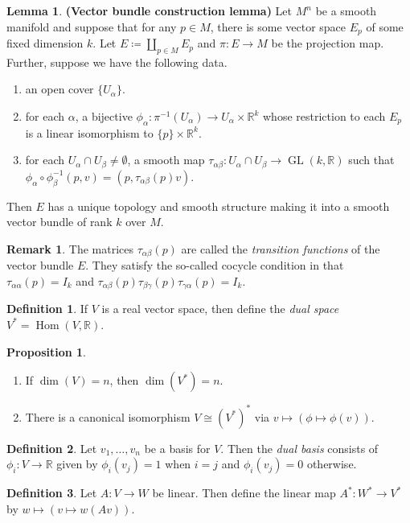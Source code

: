 \documentclass[10pt,letterpaper,cm]{nupset}
\theoremstyle{definition}
\newtheorem*{definition}{Definition}
\newtheorem{remark}{Remark}
\newtheorem{lemma}{Lemma}
\newtheorem{prop}{Proposition}
\newcommand{\R}{\mathbb R}
\newcommand{\1}{\mathbf{1}}
\newcommand{\0}{\vec 0}
\DeclareMathOperator{\GL}{GL}
\DeclareMathOperator{\Hom}{Hom}
\begin{document}
\begin{lemma}{\textbf{(Vector bundle construction lemma)}}
Let $M^n$ be a smooth manifold and suppose that for any $p\in M$, there is some vector space $E_p$ of some fixed dimension $k$. Let $E\coloneqq  \coprod_{p\in M} E_p$ and $\pi : E \to M$ be the projection map. Further, suppose we have the following data.
\begin{enumerate}
\item an open cover $\{U_{\alpha}\}$.
\item for each $\alpha$, a bijective $\phi_{\alpha} : \pi^{-1}(U_{\alpha}) \to U_{\alpha} \times \R^k$ whose restriction to each $E_p$ is a linear isomorphism to $\{p\}\times \R^k$.
\item for each $U_{\alpha} \cap U_{\beta} \ne \emptyset$, a smooth map $\tau_{\alpha \beta} : U_{\alpha} \cap U_{\beta} \to \GL(k , \R)$ such that $\phi_{\alpha} \circ \phi_{\beta}^{-1}(p, v) = (p, \tau_{\alpha \beta}(p)v)$.
\end{enumerate}
Then $E$ has a unique topology and smooth structure making it into a smooth vector bundle of rank $k$ over $M$.
\end{lemma}

\begin{remark}
The matrices $\tau_{\alpha \beta}(p)$ are called the \textit{transition functions} of the vector bundle $E$. They satisfy the so-called cocycle condition in that $\tau_{\alpha \alpha}(p) = I_k$ and $\tau_{\alpha \beta}(p)\tau_{\beta \gamma}(p)\tau_{\gamma \alpha}(p) = I_k$.
\end{remark}

\begin{definition}
If $V$ is a real vector space, then define the \textit{dual space} $V^{\ast} = \Hom(V, \R)$.
\end{definition}
\begin{prop} $ $ 
\begin{enumerate}
\item If $\dim(V) =n$, then $\dim(V^{\ast}) = n$.
\item There is a canonical isomorphism $V \cong (V^{\ast})^{\ast}$ via $v \mapsto (\phi \mapsto \phi(v))$.
\end{enumerate}
\end{prop}
\begin{definition}
Let $v_1, \ldots, v_n$ be a basis for $V$. Then the \textit{dual basis} consists of $\phi_i : V \to \R$ given by $\phi_i(v_j) = 1$ when $i = j$ and $\phi_i(v_j)= 0$ otherwise.
\end{definition}
\begin{definition}
Let $A : V \to W$ be linear. Then define the linear map $A^{\ast} : W^{\ast} \to V^{\ast}$ by $w \mapsto (v \mapsto w(Av))$.
\end{definition}
\end{document}

